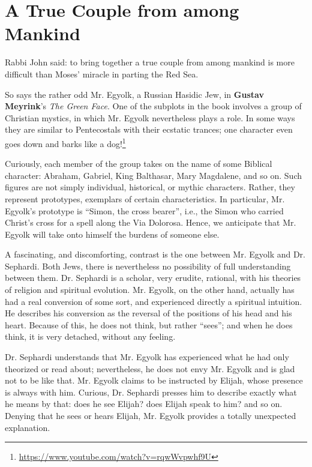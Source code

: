 \section{A True Couple from among Mankind}

\begin{quotex}
Rabbi John said: to bring together a true couple from among mankind is more difficult than Moses' miracle in parting the Red Sea.
\end{quotex}


So says the rather odd Mr. Egyolk, a Russian Hasidic Jew, in \textbf{Gustav Meyrink}'s \textit{The Green Face}. One of the subplots in the book involves a group of Christian mystics, in which Mr. Egyolk nevertheless plays a role. In some ways they are similar to Pentecostals with their ecstatic trances; one character even goes down and barks like a dog!\footnote{\url{https://www.youtube.com/watch?v=rqwWvpwhf9U}}

Curiously, each member of the group takes on the name of some Biblical character: Abraham, Gabriel, King Balthasar, Mary Magdalene, and so on. Such figures are not simply individual, historical, or mythic characters. Rather, they represent prototypes, exemplars of certain characteristics. In particular, Mr. Egyolk's prototype is ``Simon, the cross bearer'', i.e., the Simon who carried Christ's cross for a spell along the Via Dolorosa. Hence, we anticipate that Mr. Egyolk will take onto himself the burdens of someone else.

A fascinating, and discomforting, contrast is the one between Mr. Egyolk and Dr. Sephardi. Both Jews, there is nevertheless no possibility of full understanding between them. Dr. Sephardi is a scholar, very erudite, rational, with his theories of religion and spiritual evolution. Mr. Egyolk, on the other hand, actually has had a real conversion of some sort, and experienced directly a spiritual intuition. He describes his conversion as the reversal of the positions of his head and his heart. Because of this, he does not think, but rather ``sees''; and when he does think, it is very detached, without any feeling.

Dr. Sephardi understands that Mr. Egyolk has experienced what he had only theorized or read about; nevertheless, he does not envy Mr. Egyolk and is glad not to be like that. Mr. Egyolk claims to be instructed by Elijah, whose presence is always with him. Curious, Dr. Sephardi presses him to describe exactly what he means by that: does he see Elijah? does Elijah speak to him? and so on. Denying that he sees or hears Elijah, Mr. Egyolk provides a totally unexpected explanation.

